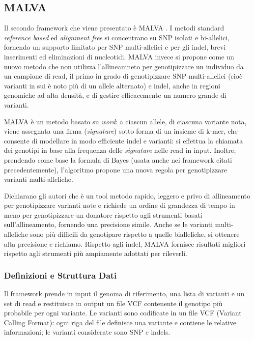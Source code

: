 \documentclass[../main.tex]{subfiles}
\begin{document}
\subsection{MALVA}
\label{malva}

Il secondo framework che viene presentato è MALVA \cite{bernardini2019malva}. I metodi standard \textit{reference based} ed \textit{alignment free} si concentrano su SNP isolati e bi-allelici, fornendo un supporto limitato per SNP multi-allelici e per gli indel, brevi inserimenti ed eliminazioni di nucleotidi. MALVA invece si propone come un nuovo metodo che non utilizza l'allineamneto per genotipizzare un individuo da un campione di read, il primo in grado di genotipizzare SNP multi-allelici (cioè varianti in sui è noto più di un allele alternato) e indel, anche in regioni genomiche ad alta densità, e di gestire efficacemente un numero grande di varianti. 

MALVA è un metodo basato su \textit{word}: a ciascun allele, di ciascuna variante nota, viene assegnata una firma (\textit{signature}) sotto forma di un insieme di k-mer, che consente di modellare in modo efficiente indel e varianti: si effettua la chiamata dei genotipi in base alla frequenza delle \textit{signature} nelle read in input. Inoltre, prendendo come base la formula di Bayes (usata anche nei framework citati precedentemente), l'algoritmo propone una nuova regola per genotipizzare varianti multi-alleliche.

Dichiarano gli autori che è un tool metodo rapido, leggero e privo di allineamento per genotipizzare varianti note e richiede un ordine di grandezza di tempo in meno per genotipizzare un donatore rispetto agli strumenti basati sull'allineamento, fornendo una precisione simile. Anche se le varianti multi-alleliche sono più difficili da genotipare rispetto a quelle bialleliche, si ottenere alta precisione e richiamo. Rispetto agli indel, MALVA fornisce risultati migliori rispetto agli strumenti più ampiamente adottati per rileverli. 


\subsubsection{Definizioni e Struttura Dati}

Il framework prende in input il genoma di riferimento, una lista di varianti e un set di read e restituisce in output un file VCF contenente il genotipo più probabile per ogni variante. Le varianti sono codificate in un file VCF (Variant Calling Format): ogni riga del file definisce una variante e contiene le relative informazioni; le varianti considerate sono SNP e indels.
\end{document}
